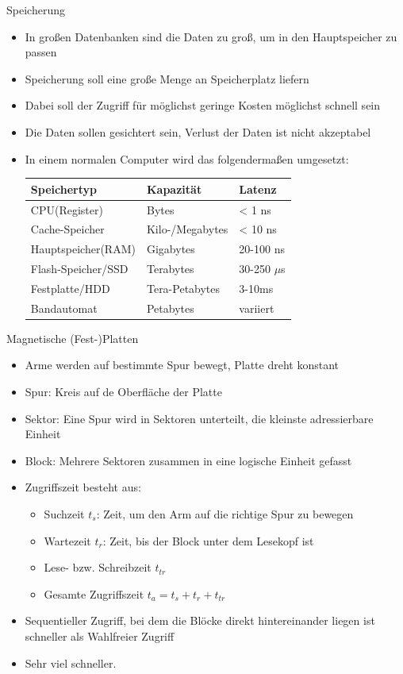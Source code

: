 \documentclass{article}
\begin{document}
\begin{block}{Speicherung}
  \begin{itemize}
    \item In großen Datenbanken sind die Daten zu groß, um in den Hauptspeicher zu passen
    \item Speicherung soll eine große Menge an Speicherplatz liefern
    \item Dabei  soll der Zugriff für möglichst geringe Kosten möglichst schnell sein
    \item Die Daten sollen gesichtert sein, Verlust der Daten ist nicht akzeptabel
    \item In einem normalen Computer wird das folgendermaßen umgesetzt:
    \begin{tabular}{|p{4cm}|p{3cm}|p{2cm}|}
      \hline
      \textbf{Speichertyp} & \textbf{Kapazität} & \textbf{Latenz} \\
      \hline
      CPU(Register) & Bytes & < 1 ns \\
      \hline
      Cache-Speicher & Kilo-/Megabytes & < 10 ns \\
      \hline
      Hauptspeicher(RAM) & Gigabytes & 20-100 ns \\
      \hline
      Flash-Speicher/SSD & Terabytes & 30-250 $\mu$s \\
      \hline
      Festplatte/HDD & Tera-Petabytes & 3-10ms \\
      \hline
      Bandautomat & Petabytes & variiert \\
      \hline
    \end{tabular}
  \end{itemize}
\end{block}

\begin{block}{Magnetische (Fest-)Platten}
  \begin{itemize}
    \item Arme werden auf bestimmte Spur bewegt, Platte dreht konstant
    \item Spur: Kreis auf de Oberfläche der Platte
    \item Sektor: Eine Spur wird in Sektoren unterteilt, die kleinste adressierbare Einheit
    \item Block: Mehrere Sektoren zusammen in eine logische Einheit gefasst
    \item Zugriffszeit besteht aus:
    \begin{itemize}
      \item Suchzeit $t_s$: Zeit, um den Arm auf die richtige Spur zu bewegen
      \item Wartezeit $t_r$: Zeit, bis der Block unter dem Lesekopf ist
      \item Lese- bzw. Schreibzeit $t_{tr}$
      \item Gesamte Zugriffszeit $t_a = t_s + t_r + t_{tr}$
    \end{itemize}
    \item Sequentieller Zugriff, bei dem die Blöcke direkt hintereinander liegen ist schneller als Wahlfreier Zugriff
    \item Sehr viel schneller.
  \end{itemize}
\end{block}
\end{document}
